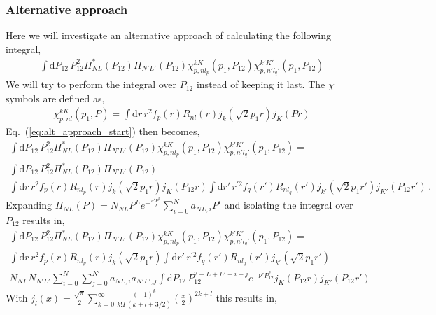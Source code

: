 \documentclass[10pt]{article}
\begin{document}
\subsubsection{Alternative approach}
Here we will investigate an alternative approach of calculating the following integral,
\begin{align}
\int \text{d} P_{12} \, P_{12}^{2} \Pi^{*}_{N L}(P_{12}) \Pi_{N' L'}(P_{12}) \chi_{p,nl_p}^{kK}(p_1,P_{12}) \chi_{p,n'l_q'}^{k'K'}(p_1,P_{12}) 
\label{eq:alt_approach_start}
\end{align}
We will try to perform the integral over $P_{12}$ instead of keeping it last.
The $\chi$ symbols are defined as,
\begin{align*}
	\chi_{p,nl}^{kK}(p_1,P) = \int \text{d} r\, r^{2} f_{p}(r) R_{n l}(r) j_{k}( \sqrt{2} p_1 r)  j_{K}(P r)
\end{align*}
Eq.~(\ref{eq:alt_approach_start}) then becomes,
\begin{multline*}
\int \text{d} P_{12} \, P_{12}^{2} \Pi^{*}_{N L}(P_{12}) \Pi_{N' L'}(P_{12}) \chi_{p,nl_p}^{kK}(p_1,P_{12}) \chi_{p,n'l_q'}^{k'K'}(p_1,P_{12}) = \\
 \int \text{d} P_{12} \, P_{12}^{2} \Pi^{*}_{N L}(P_{12}) \Pi_{N' L'}(P_{12}) \\
 \int \text{d} r\, r^{2} f_{p}(r) R_{n l_p}(r) j_{k}( \sqrt{2} p_1 r)  j_{K}(P_{12} r) 
 \int \text{d} r' \, r^{\prime 2} f_{q}(r') R_{n l_q}(r') j_{k'}( \sqrt{2} p_1 r')  j_{K'}(P_{12} r') \, .
\end{multline*}
Expanding $\Pi_{NL}(P) = N_{NL} P^{L} e^{-\frac{\nu' P^{2}}{2}} \sum_{i=0}^{N} a_{NL,i} P^{i}$ and isolating the integral over $P_{12}$ results in,
\begin{multline*}
\int \text{d} P_{12} \, P_{12}^{2} \Pi^{*}_{N L}(P_{12}) \Pi_{N' L'}(P_{12}) \chi_{p,nl_p}^{kK}(p_1,P_{12}) \chi_{p,n'l_q'}^{k'K'}(p_1,P_{12}) = \\
 \int \text{d} r\, r^{2} f_{p}(r) R_{n l_p}(r) j_{k}( \sqrt{2} p_1 r)  
 \int \text{d} r' \, r^{\prime 2} f_{q}(r') R_{n l_q}(r') j_{k'}( \sqrt{2} p_1 r')   \\
  N_{NL} N_{N'L'} \sum_{i=0}^{N} \sum_{j=0}^{N'} a_{NL,i}  a_{N'L',j} 
 \int \text{d} P_{12} \, P_{12}^{2+L+L'+i+j} e^{-\nu' P_{12}^{2}} j_{K}(P_{12} r) j_{K'}(P_{12} r')
\end{multline*}
With $j_{l}(x) = \frac{\sqrt{\pi}}{2} \sum_{k=0}^{\infty} \frac{(-1)^{k}}{k! \Gamma(k+l+3/2)} \left( \frac{x}{2} \right)^{2k+l}$ this results in,
\end{document}
